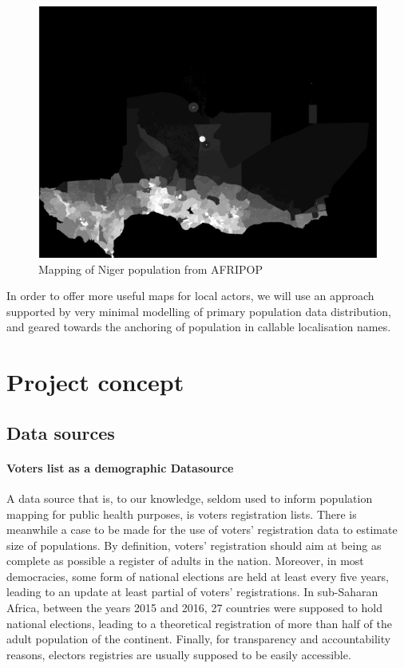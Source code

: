 \documentclass[12pt]{article}\usepackage[]{graphicx}\usepackage[]{color}
\begin{document}
\begin{figure}
	\includegraphics[width=15cm]{figure/WORLDPOP_Niger.png}
	\caption{Mapping of Niger population from AFRIPOP}
\end{figure}

In order to offer more useful maps for local actors, we will use an approach supported by very minimal modelling of primary population data distribution, and geared towards the anchoring of population in callable localisation names.

\section{Project concept}

\subsection{Data sources}

\paragraph{Voters list as a demographic Datasource} A data source that is, to our knowledge, seldom used to inform population mapping for public health purposes, is voters registration lists. There is meanwhile a case to be made for the use of voters' registration data to estimate size of populations. By definition, voters' registration should aim at being as complete as possible a register of adults in the nation. Moreover, in most democracies, some form of national elections are held at least  every five years, leading to an update at least partial of voters' registrations. In sub-Saharan Africa, between the years 2015 and 2016, 27 countries were supposed to hold national elections, leading to a theoretical registration of more than half of the adult population of the continent. Finally, for transparency and accountability reasons, electors registries are usually supposed to be easily accessible.
\end{document}
